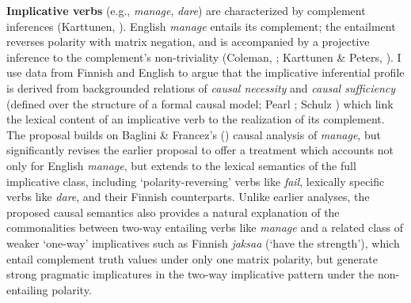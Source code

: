 \textbf{Implicative verbs} (e.g., \textit{manage}, \textit{dare}) are characterized by complement inferences (Karttunen, \cite*{karttunen1971-language}). English \textit{manage} entails its complement; the entailment reverses polarity with matrix negation, and is accompanied by a projective inference to the complement’s non-triviality (Coleman, \cite*{coleman1975-bls}; Karttunen \& Peters, \cite*{karttunen-peters1979-dinneen-oh}). I use data from Finnish and English to argue that the implicative inferential profile is derived from backgrounded relations of \textit{causal necessity} and \textit{causal sufficiency} (defined over the structure of a formal causal model; Pearl \cite*{pearl2000}; Schulz \cite*{schulz2010-synthese}) which link the lexical content of an implicative verb to the realization of its complement. The proposal builds on Baglini \& Francez’s (\cite*{baglini-francez2015-jsem}) causal analysis of \textit{manage}, but significantly revises the earlier proposal to offer a treatment which accounts not only for English \textit{manage}, but extends to the lexical semantics of the full implicative class, including ‘polarity-reversing’ verbs like \textit{fail}, lexically specific verbs like \textit{dare}, and their Finnish counterparts. Unlike earlier analyses, the proposed causal semantics also provides a natural explanation of the commonalities between two-way entailing verbs like \textit{manage} and a related class of weaker ‘one-way’ implicatives such as Finnish \textit{jaksaa} (‘have the strength’), which entail complement truth values under only one matrix polarity, but generate strong pragmatic implicatures in the two-way implicative pattern under the non-entailing polarity.
\endinput
